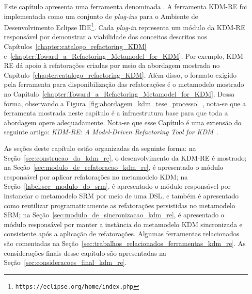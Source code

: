 Este capítulo apresenta uma ferramenta denominada . %
%
A ferramenta KDM-RE foi implementada como um conjunto de \textit{plug-ins} para o Ambiente de Desenvolvimento Eclipse IDE\footnote{\texttt{https://eclipse.org/home/index.php}}. Cada \textit{plug-in} representa um módulo da KDM-RE responsável por demonstrar a viabilidade dos conceitos descritos nos Capítulos~\ref{chapter:catalogo_refactoring_KDM} e~\ref{chapter:Toward_a_Refactoring_Metamodel_for_KDM}. Por exemplo, KDM-RE dá apoio à refatorações criadas por meio da abordagem mostrada no Capítulo~\ref{chapter:catalogo_refactoring_KDM}. Além disso, o formato exigido pela ferramenta para disponibilização das refatorações é o metamodelo mostrado no Capítulo~\ref{chapter:Toward_a_Refactoring_Metamodel_for_KDM}. Dessa forma, observando a Figura~\ref{fig:abordagem_kdm_tese_processo}~, nota-se que a ferramenta mostrada neste capítulo é a infraestrutura base para que toda a abordagem opere adequadamente. Nota-se que esse Capítulo é uma extensão do seguinte artigo: \textit{KDM-RE: A Model-Driven Refactoring Tool for KDM}~\cite{durelli_VEM_ferramenta}.


As seções deste capítulo estão organizadas da seguinte forma: na Seção~\ref{sec:construcao_da_kdm_re}, o desenvolvimento da KDM-RE é mostrado; na Seção~\ref{sec:modulo_de_refatoracao_kdm_re}, é apresentado o módulo responsável por aplicar refatorações no metamodelo KDM; na Seção~\ref{label:sec_modulo_do_srm}, é apresentado o módulo responsável por instanciar o metamodelo SRM por meio de uma DSL, e também é apresentado como reutilizar programaticamente as refatorações persistidas no metamodelo SRM; na Seção~\ref{sec:modulo_de_sincronizacao_kdm_re}, é apresentado o módulo responsável por manter a instância do metamodelo KDM sincronizada e consistente após a aplicação de refatorações. Algumas ferramentas relacionados são comentadas na Seção~\ref{sec:trabalhos_relacionados_ferramentas_kdm_re}. As considerações finais desse capítulo são apresentadas na Seção~\ref{sec:consideracoes_final_kdm_re}.

